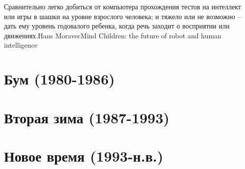 \documentclass[24pt,pdf,hyperref={unicode}]{beamer}
\begin{document}
\begin{frame}
\end{frame}

\begin{frame}
\citate
{\small
Сравнительно легко добиться от компьютера прохождения тестов на интеллект или игры в шашки на уровне взрослого человека; и тяжело или не возможно -- дать ему уровень годовалого ребенка, когда речь заходит о восприятии или движениях.}{Hans Moravec}{Mind Children: the future of robot and human intelligence}
\end{frame}


\begin{frame}
\end{frame}

\section{Бум (1980-1986) }

\section{Вторая зима (1987-1993)}

\section{Новое время (1993-н.в.)}
\end{document}
